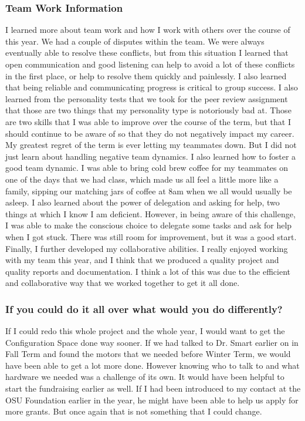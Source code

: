 \subsubsection{Team Work Information}
I learned more about team work and how I work with others over the course of this year. We had a 
couple of disputes within the team. We were always eventually able to resolve these conflicts, 
but from this situation I learned that open communication and good listening can help to avoid 
a lot of these conflicts in the first place, or help to resolve them quickly and painlessly. 
I also learned that being reliable and communicating progress is critical to group success. I 
also learned from the personality tests that we took for the peer review assignment that those 
are two things that my personality type is notoriously bad at. Those are two skills that I was 
able to improve over the course of the term, but that I should continue to be aware of so that 
they do not negatively impact my career. My greatest regret of the term is ever letting my 
teammates down. But 
I did not just learn about handling negative team dynamics. I also learned how to foster a good 
team dynamic. I was able to bring cold brew coffee for my teammates on one of the days that we 
had class, which made us all feel a little more like a family, sipping our matching jars of 
coffee at 8am when we all would usually be asleep. I also learned about the power of delegation 
and asking for help, two things at which I know I am deficient. However, in being aware of this 
challenge, I was able to make the conscious choice to delegate some tasks and ask for help when 
I got stuck. There was still room for improvement, but it was a good start. Finally, I further 
developed my collaborative abilities. I really enjoyed working with my team this year, and I 
think that we produced a quality project and quality reports and documentation. I think a lot of 
this was due to the efficient and collaborative way that we worked together to get it all done.

\subsubsection{If you could do it all over what would you do differently?}
If I could redo this whole project and the whole year, I would want to get the Configuration Space done way sooner. If we had talked to Dr. Smart earlier on in Fall Term and found the motors that we needed before Winter Term, we would have been able to get a lot more done. However knowing who to talk to and what hardware we needed was a challenge of its own. It would have been helpful to start the fundraising earlier as well. If I had been introduced to my contact at the OSU Foundation earlier in the year, he might have been able to help us apply for more grants. But once again that is not something that I could change.


